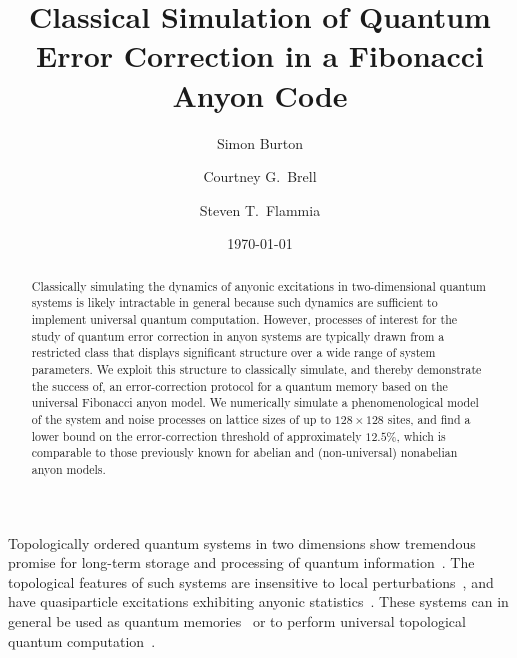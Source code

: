 \documentclass[aps, prl, letterpaper, twocolumn, superscriptaddress, notitlepage, 10pt]{revtex4}
\begin{document}
\title{Classical Simulation of Quantum Error Correction in a Fibonacci Anyon Code}

\author{Simon Burton}
\author{Courtney G.\ Brell}
\author{Steven T.\ Flammia}

\date{\today}

\begin{abstract}
Classically simulating the dynamics of anyonic excitations in two-dimensional quantum systems is likely intractable in general because such dynamics are sufficient to implement 
universal quantum computation. However, processes of interest for the study of quantum 
error correction in anyon systems are typically drawn from a restricted class that displays 
significant structure over a wide range of system parameters.
We exploit this structure to classically simulate, and thereby demonstrate the success of, an 
error-correction protocol for a quantum memory based on the universal Fibonacci anyon 
model.  We numerically simulate a phenomenological model of the system and noise 
processes on lattice sizes of up to 
$128\times128$ sites, and find a lower bound on the error-correction threshold of 
approximately $12.5\%$, which is comparable to those previously known for abelian and 
(non-universal) nonabelian anyon models.
\end{abstract}

\maketitle


Topologically ordered quantum systems in two dimensions show tremendous promise for 
long-term storage and processing of quantum information~\cite{Kitaev2003, Dennis2002, Nayak2008}. 
The topological features of such systems are insensitive to local 
perturbations~\cite{Bravyi2010, Bravyi2011a, Michalakis2013}, and have quasiparticle excitations 
exhibiting anyonic statistics~\cite{Wilczek1990}. These systems can in general be used as 
quantum memories~\cite{Kitaev2003, Dennis2002} or to perform universal topological 
quantum computation~\cite{Freedman2002, Nayak2008}.
\end{document}
